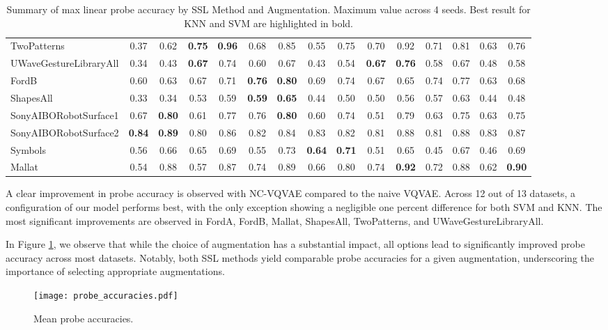 \documentclass[../../thesis.tex]{subfiles}
\begin{document}
\begin{table}[H]
\begin{adjustbox}{width=\textwidth}
\begin{tabular}{lcc|cc|cc|cc|cc|cc|cc}
        TwoPatterns             & 0.37 & 0.62 & \textbf{0.75} & \textbf{0.96} & 0.68 & 0.85 & 0.55 & 0.75 & 0.70 & 0.92 & 0.71 & 0.81 & 0.63 & 0.76 \\
        UWaveGestureLibraryAll  & 0.34 & 0.43 & \textbf{0.67} & 0.74 & 0.60 & 0.67 & 0.43 & 0.54 & \textbf{0.67} & \textbf{0.76} & 0.58 & 0.67 & 0.48 & 0.58 \\
        FordB                   & 0.60 & 0.63 & 0.67 & 0.71 & \textbf{0.76} & \textbf{0.80} & 0.69 & 0.74 & 0.67 & 0.65 & 0.74 & 0.77 & 0.63 & 0.68 \\
        ShapesAll               & 0.33 & 0.34 & 0.53 & 0.59 & \textbf{0.59} & \textbf{0.65} & 0.44 & 0.50 & 0.50 & 0.56 & 0.57 & 0.63 & 0.44 & 0.48 \\
        SonyAIBORobotSurface1   & 0.67 & \textbf{0.80} & 0.61 & 0.77 & 0.76 & \textbf{0.80} & 0.60 & 0.74 & 0.51 & 0.79 & 0.63 & 0.75 & 0.63 & 0.75 \\
        SonyAIBORobotSurface2   & \textbf{0.84} & \textbf{0.89} & 0.80 & 0.86 & 0.82 & 0.84 & 0.83 & 0.82 & 0.81 & 0.88 & 0.81 & 0.88 & 0.83 & 0.87 \\
        Symbols                 & 0.56 & 0.66 & 0.65 & 0.69 & 0.55 & 0.73 & \textbf{0.64} & \textbf{0.71} & 0.51 & 0.65 & 0.45 & 0.67 & 0.46 & 0.69 \\
        Mallat                  & 0.54 & 0.88 & 0.57 & 0.87 & 0.74 & 0.89 & 0.66 & 0.80 & 0.74 & \textbf{0.92} & 0.72 & 0.88 & 0.62 & \textbf{0.90} \\


        \bottomrule
    \end{tabular}
    \end{adjustbox}
    
    \caption{Summary of max linear probe accuracy by SSL Method and Augmentation. Maximum value across 4 seeds. Best result for KNN and SVM are highlighted in bold.}
    \label{tab:best_probe}
\end{table}

A clear improvement in probe accuracy is observed with NC-VQVAE compared to the naive VQVAE. Across 12 out of 13 datasets, a configuration of our model performs best, with the only exception showing a negligible one percent difference for both SVM and KNN. The most significant improvements are observed in FordA, FordB, Mallat, ShapesAll, TwoPatterns, and UWaveGestureLibraryAll.\newline

In Figure \ref{fig:Mean_probe}, we observe that while the choice of augmentation has a substantial impact, all options lead to significantly improved probe accuracy across most datasets. Notably, both SSL methods yield comparable probe accuracies for a given augmentation, underscoring the importance of selecting appropriate augmentations. \newline
\begin{figure}[h]
    \texttt{[image: probe\_accuracies.pdf]}
    \centering  
    \caption{Mean probe accuracies.}
    \label{fig:Mean_probe}
\end{figure}
\end{document}
